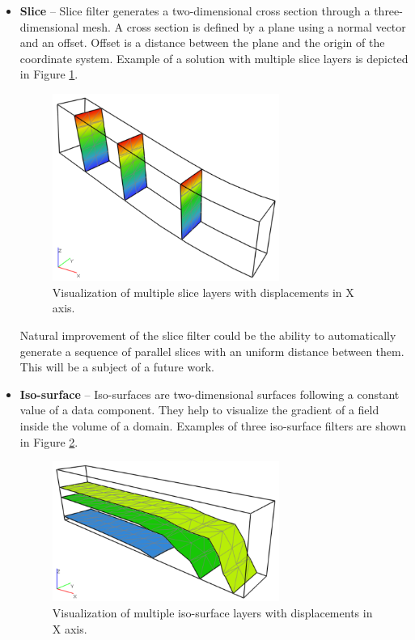 \begin{itemize}
    \item \textbf{Slice} -- Slice filter generates a two-dimensional cross section through a three-dimensional mesh. A cross section is defined by a plane using a normal vector and an offset. Offset is a distance between the plane and the origin of the coordinate system. Example of a solution with multiple slice layers is depicted in Figure \ref{fig:beam-slice-layers}.
    
    \begin{figure}[H]
        \centering
        \includegraphics[width=0.7\textwidth]{figures/chapter-data-management/beam-slice-layers}
        \decoRule
        \caption[Visualization of multiple slice layers]{Visualization of multiple slice layers with displacements in X axis.}
        \label{fig:beam-slice-layers}
    \end{figure}

    Natural improvement of the slice filter could be the ability to automatically generate a sequence of parallel slices with an uniform distance between them. This will be a subject of a future work.
    
    \item \textbf{Iso-surface} -- Iso-surfaces are two-dimensional surfaces following a constant value of a data component. They help to visualize the gradient of a field inside the volume of a domain. Examples of three iso-surface filters are shown in Figure \ref{fig:beam-isosurface-layers}.
    
    \begin{figure}[H]
        \centering
        \includegraphics[width=0.7\textwidth]{figures/chapter-data-management/beam-isosurface-layers}
        \decoRule
        \caption[Visualization of multiple iso-surface layers]{Visualization of multiple iso-surface layers with displacements in X axis.}
        \label{fig:beam-isosurface-layers}
    \end{figure}


\end{itemize}
